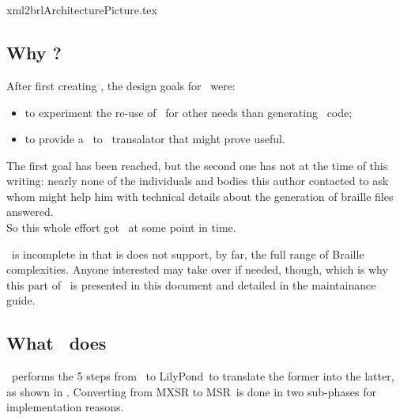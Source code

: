 
\chapter{\xmlToBrl\ }

{xml2brlArchitecturePicture.tex}


\section{Why \xmlToBrl?}

After first creating \xmlToLy, the design goals for \xmlToBrl\ were:
\begin{itemize}
\item to experiment the re-use of \msrRepr\ for other needs than generating \lily\ code;
\item to provide a \mxml\ to \braille\ transalator that might prove useful.
\end{itemize}

The first goal has been reached, but the second one has not at the time of this writing: nearly none of the individuals and bodies this author contacted to ask whom might help him with technical details about the generation of braille files answered.\\
So this whole effort got \frozen\ at some point in time.

\xmlToBrl\ is incomplete in that is does not support, by far, the full range of Braille complexities. Anyone interested may take over if needed, though, which is why this part of \mf\ is presented in this document and detailed in the maintainance guide.


\section{What \xmlToBrl\ does}

\xmlToBrl\ performs the 5 steps from \mxml\ to LilyPond\ to translate the former into the latter, as shown in . Converting from MXSR to MSR\ is done in two sub-phases for implementation reasons.

